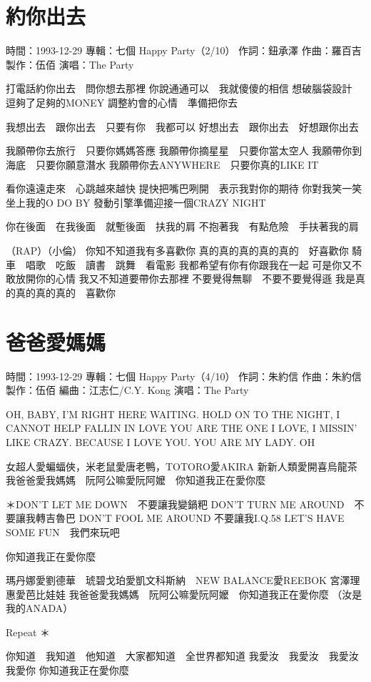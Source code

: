 \documentclass[UTF8,a4paper,oneside,twocolumn,12pt]{ctexbook}
\newcommand{\infopair}[2]{\textbullet #1：#2}
\newcommand{\zc}[1][伍佰]{\infopair{作詞}{#1}}
\newcommand{\zq}[1][伍佰]{\infopair{作曲}{#1}}
\newcommand{\bq}[1][伍佰]{\infopair{編曲}{#1}}
\newcommand{\zj}[1]{\infopair{專輯}{#1}}
\newcommand{\zz}[1]{\infopair{製作}{#1}}
\newcommand{\sj}[1]{\infopair{時間}{#1}}
\newenvironment{info}{\begin{flushleft}\kaishu
	}
	{\end{flushleft}\normalsize\yahei\par}
\newenvironment{lyric}{
	}
{}
\begin{document}
\section{約你出去}
\begin{info}
	\sj{1993-12-29}
	\zj{七個 Happy Party（2/10）}
	\zc[鈕承澤]
	\zq[羅百吉]
	\zz{伍佰}
	\infopair{演唱}{The Party}
\end{info}
\begin{lyric}
	打電話約你出去　問你想去那裡
	你說通通可以　我就傻傻的相信
	想破腦袋設計　逗夠了足夠的MONEY
	調整約會的心情　準備把你去

	我想出去　跟你出去　只要有你　我都可以
	好想出去　跟你出去　好想跟你出去

	我願帶你去旅行　只要你媽媽答應
	我願帶你摘星星　只要你當太空人
	我願帶你到海底　只要你願意潛水
	我願帶你去ANYWHERE　只要你真的LIKE IT

	看你遠遠走來　心跳越來越快
	提快把嘴巴咧開　表示我對你的期待
	你對我笑一笑　坐上我的O DO BY
	發動引擎準備迎接一個CRAZY NIGHT

	你在後面　在我後面　就塹後面　扶我的肩
	不抱著我　有點危險　手扶著我的肩

	（RAP）（小倫）
	你知不知道我有多喜歡你
	真的真的真的真的真的　好喜歡你
	騎車　唱歌　吃飯　讀書　跳舞　看電影
	我都希望有你有你跟我在一起
	可是你又不敢放開你的心情
	我又不知道要帶你去那裡
	不要覺得無聊　不要不要覺得遜
	我是真的真的真的真的　喜歡你
\end{lyric}

\section{爸爸愛媽媽}
\begin{info}
	\sj{1993-12-29}
	\zj{七個 Happy Party（4/10）}
	\zc[朱約信]
	\zq[朱約信]
	\zz{伍佰}
	\bq[江志仁/C.Y. Kong]
	\infopair{演唱}{The Party}
\end{info}
\begin{lyric}
	OH, BABY, I'M RIGHT HERE WAITING. HOLD ON TO
	THE NIGHT, I CANNOT HELP FALLIN IN LOVE
	YOU ARE THE ONE I LOVE, I MISSIN' LIKE CRAZY.
	BECAUSE I LOVE YOU.
	YOU ARE MY LADY. OH

	女超人愛蝙蝠俠，米老鼠愛唐老鴨，TOTORO愛AKIRA
	新新人類愛開喜烏龍茶
	我爸爸愛我媽媽　阮阿公嘛愛阮阿嬤　你知道我正在愛你麼

	＊DON'T LET ME DOWN　不要讓我變鍋粑
	DON'T TURN ME AROUND　不要讓我轉吉魯巴
	DON'T FOOL ME AROUND 不要讓我I.Q.58
	LET'S HAVE SOME FUN　我們來玩吧

	你知道我正在愛你麼

	瑪丹娜愛劉德華　琥碧戈珀愛凱文科斯納　NEW BALANCE愛REEBOK
	宮澤理惠愛芭比娃娃
	我爸爸愛我媽媽　阮阿公嘛愛阮阿嬤　你知道我正在愛你麼
	（汝是我的ANADA）

	Repeat ＊

	你知道　我知道　他知道　大家都知道　全世界都知道
	我愛汝　我愛汝　我愛汝　我愛你
	你知道我正在愛你麼
\end{lyric}
\end{document}
